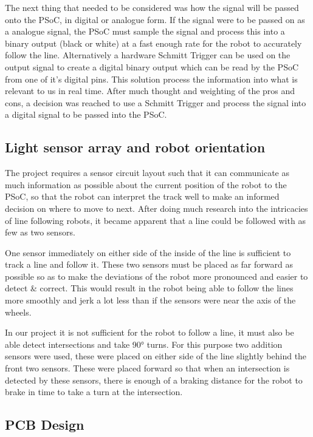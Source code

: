 \documentclass{article}
\begin{document}
The next thing that needed to be considered was how the signal will be passed onto the PSoC, in digital or analogue form. If the signal were to be passed on as a analogue signal, the PSoC must sample the signal and process this into a binary output (black or white) at a fast enough rate for the robot to accurately follow the line. Alternatively a hardware Schmitt Trigger can be used on the output signal to create a digital binary output which can be read by the PSoC from one of it's digital pins. This solution process the information into what is relevant to us in real time. After much thought and weighting of the pros and cons, a decision was reached to  use a Schmitt Trigger and process the signal into a digital signal to be passed into the PSoC.

\subsection{Light sensor array and robot orientation}

The project requires a sensor circuit layout such that it can communicate as much information as possible about the current position of the robot to the PSoC, so that the robot can interpret the track well to make an informed decision on where to move to next. After doing much research into the intricacies of line following robots, it became apparent that a line could be followed with as few as two sensors.

One sensor immediately on either side of the inside of the line is sufficient to track a line and follow it. These two sensors must be placed as far forward as possible so as to make the deviations of the robot more pronounced and easier to detect \& correct. This would result in the robot being able to follow the lines more smoothly and jerk a lot less than if the sensors were near the axis of the wheels.

In our project it is not sufficient for the robot to follow a line, it must also be able detect intersections and take 90° turns. For this purpose two addition sensors were used, these were placed on either side of the line slightly behind the front two sensors. These were placed forward so that when an intersection is detected by these sensors, there is enough of a braking distance for the robot to brake in time to take a turn at the intersection.

\subsection{PCB Design}
\end{document}
